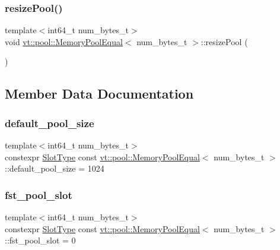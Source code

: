 \subsubsection{\texorpdfstring{resize\+Pool()}{resizePool()}}
{\footnotesize\ttfamily template$<$int64\+\_\+t num\+\_\+bytes\+\_\+t$>$ \\
void \hyperlink{structvt_1_1pool_1_1_memory_pool_equal}{vt\+::pool\+::\+Memory\+Pool\+Equal}$<$ num\+\_\+bytes\+\_\+t $>$\+::resize\+Pool (\begin{DoxyParamCaption}{ }\end{DoxyParamCaption})}



\subsection{Member Data Documentation}
\mbox{\label{structvt_1_1pool_1_1_memory_pool_equal_a67dae02a7795b182a7302b9eb34924e7}} 
\subsubsection{\texorpdfstring{default\+\_\+pool\+\_\+size}{default\_pool\_size}}
{\footnotesize\ttfamily template$<$int64\+\_\+t num\+\_\+bytes\+\_\+t$>$ \\
constexpr \hyperlink{structvt_1_1pool_1_1_memory_pool_equal_a101fdcb943d0cb0863cf17655e0b4e1c}{Slot\+Type} const \hyperlink{structvt_1_1pool_1_1_memory_pool_equal}{vt\+::pool\+::\+Memory\+Pool\+Equal}$<$ num\+\_\+bytes\+\_\+t $>$\+::default\+\_\+pool\+\_\+size = 1024\hspace{0.3cm}{\ttfamily [static]}}

\mbox{\label{structvt_1_1pool_1_1_memory_pool_equal_ae0435baf515fefccc015b600357bc6bb}} 
\subsubsection{\texorpdfstring{fst\+\_\+pool\+\_\+slot}{fst\_pool\_slot}}
{\footnotesize\ttfamily template$<$int64\+\_\+t num\+\_\+bytes\+\_\+t$>$ \\
constexpr \hyperlink{structvt_1_1pool_1_1_memory_pool_equal_a101fdcb943d0cb0863cf17655e0b4e1c}{Slot\+Type} const \hyperlink{structvt_1_1pool_1_1_memory_pool_equal}{vt\+::pool\+::\+Memory\+Pool\+Equal}$<$ num\+\_\+bytes\+\_\+t $>$\+::fst\+\_\+pool\+\_\+slot = 0\hspace{0.3cm}{\ttfamily [static]}}



